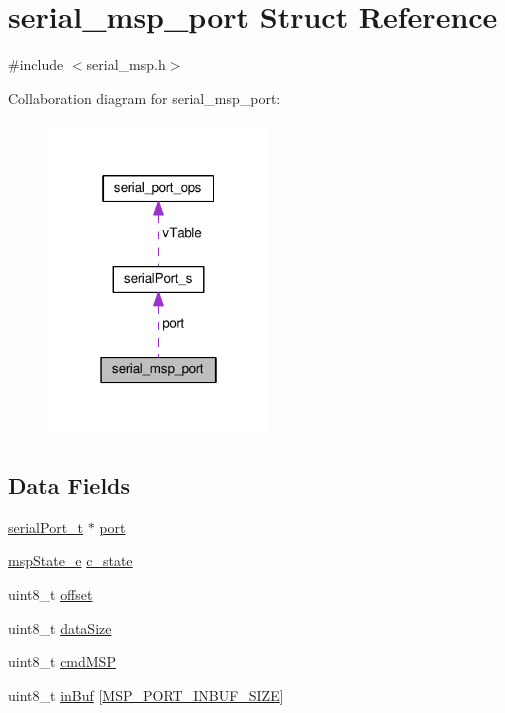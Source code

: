 \hypertarget{structserial__msp__port}{\section{serial\+\_\+msp\+\_\+port Struct Reference}
\label{structserial__msp__port}
}


{\ttfamily \#include $<$serial\+\_\+msp.\+h$>$}



Collaboration diagram for serial\+\_\+msp\+\_\+port\+:\nopagebreak
\begin{figure}[H]
\begin{center}
\leavevmode
\includegraphics[width=166pt]{structserial__msp__port__coll__graph}
\end{center}
\end{figure}
\subsection*{Data Fields}
\begin{DoxyCompactItemize}
\item 
\hyperlink{drivers_2serial_8h_a64a5e2f04e1a908fbb1b3b165f88e0ef}{serial\+Port\+\_\+t} $\ast$ \hyperlink{structserial__msp__port_a7dd310a82821a567bd264e6daababc23}{port}
\item 
\hyperlink{serial__msp_8h_aa61e8d673dede45bd0e23ab09c14aba5}{msp\+State\+\_\+e} \hyperlink{structserial__msp__port_a9a0697ac09c1bc1599ff15d82b1d6fdb}{c\+\_\+state}
\item 
uint8\+\_\+t \hyperlink{structserial__msp__port_abcaf0252d4e99c057cb85cc58c0d68b2}{offset}
\item 
uint8\+\_\+t \hyperlink{structserial__msp__port_a7fa4bf5a91177dc106c6ed8657ef032e}{data\+Size}
\item 
uint8\+\_\+t \hyperlink{structserial__msp__port_aa5d461548f8635527072a16fd685086d}{cmd\+M\+S\+P}
\item 
uint8\+\_\+t \hyperlink{structserial__msp__port_af4465500e579489110ca6e936b380ac4}{in\+Buf} \mbox{[}\hyperlink{serial__msp_8h_a0965abdf6d185e1c33d6a36e2e0f80c0}{M\+S\+P\+\_\+\+P\+O\+R\+T\+\_\+\+I\+N\+B\+U\+F\+\_\+\+S\+I\+Z\+E}\mbox{]}
\end{DoxyCompactItemize}


